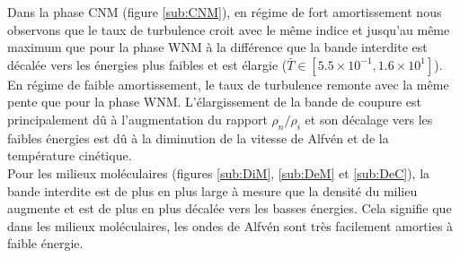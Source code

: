 \documentclass[10pt,a4paper]{article}
\begin{document}
Dans la phase CNM (figure \ref{sub:CNM}), en régime de fort amortissement nous observons que le taux de turbulence croit avec le même indice et jusqu'au même maximum que pour la phase WNM à la différence que la bande interdite est décalée vers les énergies plus faibles et est élargie ($\bar{T} \in [5.5\times 10^{-1}, 1.6\times 10^{1}]$). En régime de faible amortissement, le taux de turbulence remonte avec la même pente que pour la phase WNM. L'élargissement de la bande de coupure est principalement dû à l'augmentation du rapport $\rho_n / \rho_i$ et son décalage vers les faibles énergies est dû à la diminution de la vitesse de Alfvén et de la température cinétique. \\ 

Pour les milieux moléculaires (figures \ref{sub:DiM}, \ref{sub:DeM} et \ref{sub:DeC}), la bande interdite est de plus en plus large à mesure que la densité du milieu augmente et est de plus en plus décalée vers les basses énergies. Cela signifie que dans les milieux moléculaires, les ondes de Alfvén sont très facilement amorties à faible énergie. 
\end{document}
